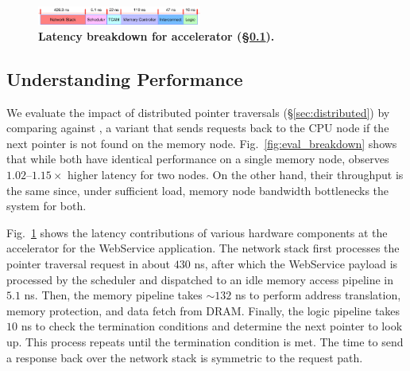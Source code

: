 \begin{figure}[t]
  \centering	
  \includegraphics[width=0.48\textwidth]{fig/pulse/breakdown_latency_new.pdf}
  \vspace{-1em}
  \caption{\textbf{Latency breakdown for \name accelerator (\S\ref{ssec:breakdown}).}}
  \label{fig:eval_breakdown_latency_}%
\end{figure}




\subsection{Understanding \name Performance}
\label{ssec:breakdown}




 We evaluate the impact of distributed pointer traversals (\S\ref{sec:distributed}) by comparing \name against \nameacc, a \name variant that sends requests back to the CPU node if the next pointer is not found on the memory node. Fig.~\ref{fig:eval_breakdown} shows that while both have identical performance on a single memory node, \nameacc observes $1.02$--$1.15\times$ higher latency for two nodes. On the other hand, their throughput is the same since, under sufficient load, memory node bandwidth bottlenecks the system for both.





Fig.~\ref{fig:eval_breakdown_latency_} shows the latency contributions of various hardware components at the \name accelerator for the WebService application. The network stack first processes the pointer traversal request in about $430$ ns, after which the WebService payload is processed by the scheduler and dispatched to an idle memory access pipeline in $5.1$ ns. Then, the memory pipeline takes $\sim$$132$ ns to perform address translation, memory protection, and data fetch from DRAM. Finally, the logic pipeline takes $10$ ns to check the termination conditions and determine the next pointer to look up. This process repeats until the termination condition is met. The time to send a response back over the network stack is symmetric to the request path.












